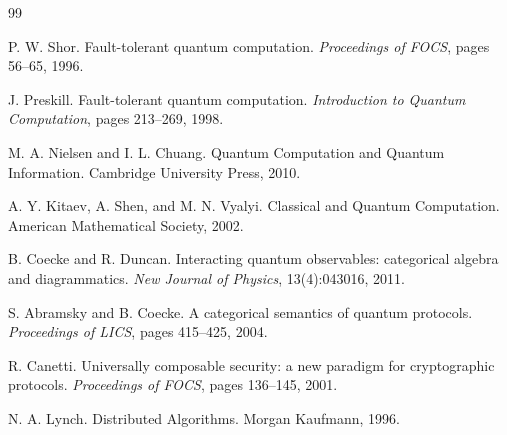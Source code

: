 \documentclass[11pt]{article}
\begin{document}

\begin{thebibliography}{99}

P. W. Shor.
\newblock Fault-tolerant quantum computation.
\newblock \textit{Proceedings of FOCS}, pages 56--65, 1996.

J. Preskill.
\newblock Fault-tolerant quantum computation.
\newblock \textit{Introduction to Quantum Computation}, pages 213--269, 1998.

M. A. Nielsen and I. L. Chuang.
\newblock Quantum Computation and Quantum Information.
\newblock Cambridge University Press, 2010.

A. Y. Kitaev, A. Shen, and M. N. Vyalyi.
\newblock Classical and Quantum Computation.
\newblock American Mathematical Society, 2002.

B. Coecke and R. Duncan.
\newblock Interacting quantum observables: categorical algebra and diagrammatics.
\newblock \textit{New Journal of Physics}, 13(4):043016, 2011.

S. Abramsky and B. Coecke.
\newblock A categorical semantics of quantum protocols.
\newblock \textit{Proceedings of LICS}, pages 415--425, 2004.

R. Canetti.
\newblock Universally composable security: a new paradigm for cryptographic protocols.
\newblock \textit{Proceedings of FOCS}, pages 136--145, 2001.

N. A. Lynch.
\newblock Distributed Algorithms.
\newblock Morgan Kaufmann, 1996.

\end{thebibliography}
\end{document}

